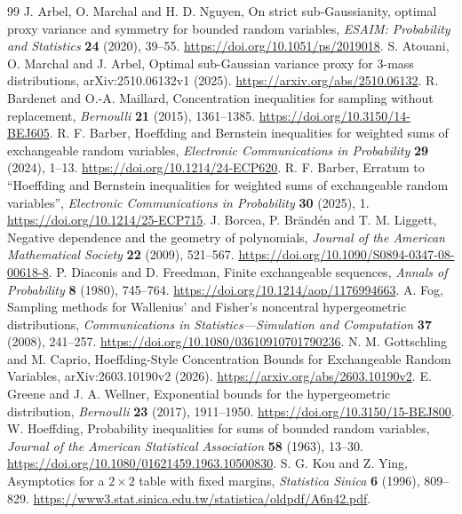 \begin{thebibliography}{99}\setlength{\itemsep}{3pt}
 J. Arbel, O. Marchal and H. D. Nguyen, On strict sub-Gaussianity, optimal proxy variance and symmetry for bounded random variables, \emph{ESAIM: Probability and Statistics} \textbf{24} (2020), 39--55. \url{https://doi.org/10.1051/ps/2019018}.
 S. Atouani, O. Marchal and J. Arbel, Optimal sub-Gaussian variance proxy for 3-mass distributions, arXiv:2510.06132v1 (2025). \url{https://arxiv.org/abs/2510.06132}.
 R. Bardenet and O.-A. Maillard, Concentration inequalities for sampling without replacement, \emph{Bernoulli} \textbf{21} (2015), 1361--1385. \url{https://doi.org/10.3150/14-BEJ605}.
 R. F. Barber, Hoeffding and Bernstein inequalities for weighted sums of exchangeable random variables, \emph{Electronic Communications in Probability} \textbf{29} (2024), 1--13. \url{https://doi.org/10.1214/24-ECP620}.
 R. F. Barber, Erratum to ``Hoeffding and Bernstein inequalities for weighted sums of exchangeable random variables'', \emph{Electronic Communications in Probability} \textbf{30} (2025), 1. \url{https://doi.org/10.1214/25-ECP715}.
 J. Borcea, P. Br\"and\'en and T. M. Liggett, Negative dependence and the geometry of polynomials, \emph{Journal of the American Mathematical Society} \textbf{22} (2009), 521--567. \url{https://doi.org/10.1090/S0894-0347-08-00618-8}.
 P. Diaconis and D. Freedman, Finite exchangeable sequences, \emph{Annals of Probability} \textbf{8} (1980), 745--764. \url{https://doi.org/10.1214/aop/1176994663}.
 A. Fog, Sampling methods for Wallenius' and Fisher's noncentral hypergeometric distributions, \emph{Communications in Statistics---Simulation and Computation} \textbf{37} (2008), 241--257. \url{https://doi.org/10.1080/03610910701790236}.
 N. M. Gottschling and M. Caprio, Hoeffding-Style Concentration Bounds for Exchangeable Random Variables, arXiv:2603.10190v2 (2026). \url{https://arxiv.org/abs/2603.10190v2}.
 E. Greene and J. A. Wellner, Exponential bounds for the hypergeometric distribution, \emph{Bernoulli} \textbf{23} (2017), 1911--1950. \url{https://doi.org/10.3150/15-BEJ800}.
 W. Hoeffding, Probability inequalities for sums of bounded random variables, \emph{Journal of the American Statistical Association} \textbf{58} (1963), 13--30. \url{https://doi.org/10.1080/01621459.1963.10500830}.
 S. G. Kou and Z. Ying, Asymptotics for a $2\times2$ table with fixed margins, \emph{Statistica Sinica} \textbf{6} (1996), 809--829. \url{https://www3.stat.sinica.edu.tw/statistica/oldpdf/A6n42.pdf}.

\end{thebibliography}

